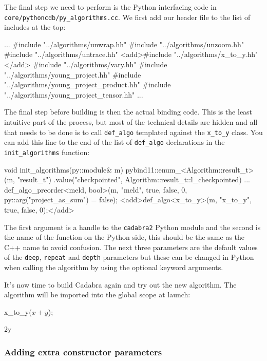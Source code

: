 \documentclass{article}
\begin{document}
The final step we need to perform is the Python interfacing code in \verb|core/pythoncdb/py_algorithms.cc|. We first add our
header file to the list of includes at the top:
\begin{lstcpp}
	...
	#include "../algorithms/unwrap.hh"
	#include "../algorithms/unzoom.hh"
	#include "../algorithms/untrace.hh"
	<add>#include "../algorithms/x_to_y.hh"</add>
	#include "../algorithms/vary.hh"
	#include "../algorithms/young_project.hh"
	#include "../algorithms/young_project_product.hh"
	#include "../algorithms/young_project_tensor.hh"
	...
\end{lstcpp}
The final step before building is then the actual binding code. This is the least intuitive part of the process, but most of
the technical details are hidden and all that needs to be done is to call \verb|def_algo| templated against the
\verb|x_to_y| class. You can add this line to the end of the list of \verb|def_algo| declarations in the 
\verb|init_algorithms| function:
\begin{lstcpp}
	void init_algorithms(py::module& m)
		{
		pybind11::enum_<Algorithm::result_t>(m, "result_t")
		.value("checkpointed", Algorithm::result_t::l_checkpointed)
		...
		def_algo_preorder<meld, bool>(m, "meld", true, false, 0, py::arg("project_as_sum") = false);
		<add>def_algo<x_to_y>(m, "x_to_y", true, false, 0);</add>
		}
\end{lstcpp}
The first argument is a handle to the \verb|cadabra2| Python module and the second is the name of the function on the 
Python side, this should be the same as the C++ name to avoid confusion. The next three parameters are the default values of
the \verb|deep|, \verb|repeat| and \verb|depth| parameters but these can be changed in Python when calling the algorithm
by using the optional keyword arguments.

It's now time to build Cadabra again and try out the new algorithm. The algorithm will be imported into the global scope at
launch:
\begin{lstcdb}
	x_to_y($x + y$);
\end{lstcdb}
\begin{lstverb}
	2y
\end{lstverb}

\subsubsection*{Adding extra constructor parameters}
\end{document}

